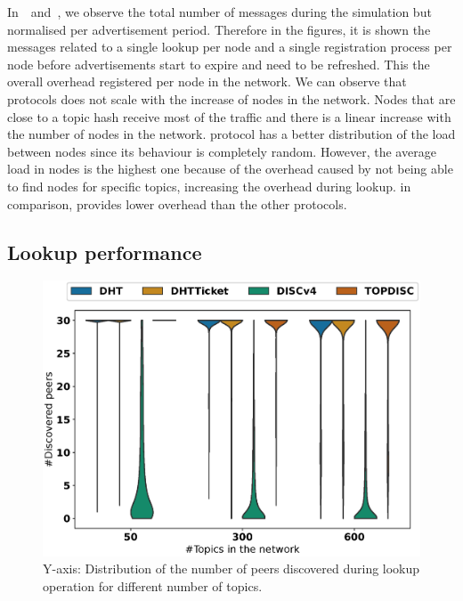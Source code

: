 In~~and~, we observe the total number of messages during the simulation but normalised per advertisement period. 
Therefore in the figures, it is shown the messages related to a single lookup per node and a single registration process per node before advertisements start to expire and need to be refreshed.
This the overall overhead registered per node in the network.
We can observe that \altname protocols does not scale with the increase of nodes in the network. 
Nodes that are close to a topic hash receive most of the traffic and there is a linear increase with the number of nodes in the network. 
\discv protocol has a better distribution of the load between nodes since its behaviour is completely random. However, the average load in nodes is the highest one because of the overhead caused by not being able to find nodes for specific topics, increasing the overhead during lookup.
\sysname in comparison, provides lower overhead than the other protocols.

\subsection{Lookup performance}

\begin{figure}[!h]
\includegraphics[width=\linewidth]{results/efficiency/violin_topic_discovered.eps}
\caption{Y-axis: Distribution of the number of peers discovered during lookup operation for different number of topics.}
\label{fig:discoveredPerTopic}
\end{figure}

